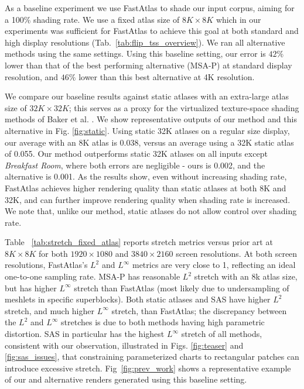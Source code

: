 As a baseline experiment we use FastAtlas to shade our input corpus, aiming for a 100\% shading rate. We use a fixed atlas size of $8K \times 8K$ which in our experiments was sufficient for FastAtlas to achieve this goal at both standard and high display resolutions (Tab.~\ref{tab:flip_tss_overview}). We ran all alternative methods using the same settings. Using this baseline setting, our \FLIP error is $42\%$ lower than that of the best performing alternative (MSA-P) at standard display resolution, and $46\%$ lower than this best alternative at 4K resolution.
  
We compare our baseline results against static atlases with an extra-large atlas size of $32K \times 32K$; this serves as a proxy for the virtualized texture-space shading methods of Baker et al. \cite{baker:2016,Baker2022}. We show representative outputs of our method and this alternative in Fig. \ref{fig:static}. 
Using static 32K atlases on a regular size display, our average \FLIP with an 8K atlas is 0.038, versus an average \FLIP using a 32K static atlas of 0.055. Our method outperforms static 32K atlases on all inputs except {\em Breakfast Room}, where both \FLIP errors are negligible - ours is 0.002, and the alternative is 0.001. As the results show, even without increasing shading rate, FastAtlas achieves higher rendering quality than static atlases at both 8K and 32K, and can further improve rendering quality when shading rate is increased. We note that, unlike our method, static atlases do not allow control over shading rate. 



Table ~\ref{tab:stretch_fixed_atlas} reports stretch metrics versus prior art at $8K \times 8K$ for both $1920 \times 1080$ and $3840 \times 2160$ screen resolutions. At both screen resolutions, FastAtlas's $L^2$ and $L^\infty$ metrics are very close to 1, reflecting an ideal one-to-one sampling rate. MSA-P has reasonable $L^2$ stretch with an 8k atlas size, but has higher $L^\infty$ stretch than FastAtlas (most likely due to undersampling of meshlets in specific superblocks). Both static atlases and SAS have higher $L^2$ stretch, and much higher $L^\infty$ stretch, than FastAtlas; the discrepancy between the $L^2$ and $L^\infty$ stretches is due to both methods having high parametric distortion. SAS in particular has the highest $L^\infty$ stretch of all methods, consistent with our observation, illustrated in Figs. \ref{fig:teaser} and \ref{fig:sas_issues}, that constraining parameterized charts to rectangular patches can introduce excessive stretch. Fig~\ref{fig:prev_work} shows a representative example of our and alternative renders generated using this baseline setting. 

